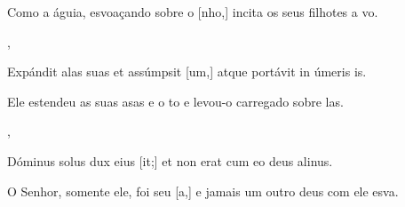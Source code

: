 {    {\item {}Como a águia, esvoaçando sobre o [nho,] incita os seus filhotes a vo.~\Responsorium},
  {\item {}Expándit alas suas et assúmpsit [um,] atque portávit in úmeris is.~\Responsorium}%
    {\item {}Ele estendeu as suas asas e o to e levou-o carregado sobre las.~\Responsorium},
  {\item {}Dóminus solus dux eius [it;] et non erat cum eo deus alinus.~\Responsorium}%
    {\item {}O Senhor, somente ele, foi seu [a,] e jamais um outro deus com ele esva.~\Responsorium}
}